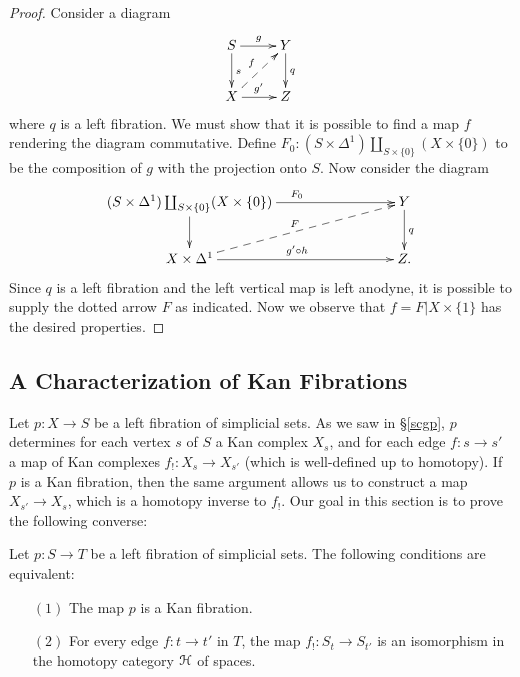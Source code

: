 \begin{proof}
Consider a diagram
$$ \xymatrix{ S \ar[d]^{s} \ar[r]^{g} & Y \ar[d]^{q} \\
X \ar[r]^{g'} \ar@{-->}^{f}[ur] & Z }$$
where $q$ is a left fibration. We must show that it is possible to find a map
$f$ rendering the diagram commutative. Define
$F_0: (S \times \Delta^1) \coprod_{ S \times \{ 0 \} } (X \times \{0\})$
to be the composition of $g$ with the projection onto $S$.
Now consider the diagram
$$ \xymatrix{ (S \times \Delta^1) \coprod_{ S \times \{0\} }
(X \times \{0\}) \ar[d] \ar[rrr]^{F_0} & & & Y \ar[d]^{q} \\
X \times \Delta^1 \ar[rrr]^{g' \circ h} \ar@{-->}[urrr]^{F} & & & Z. }$$
Since $q$ is a left fibration and the left vertical map is left anodyne, it
is possible to supply the dotted arrow $F$ as indicated. Now we observe that
$f = F|X \times \{1\}$ has the desired properties.
\end{proof}

\subsection{A Characterization of Kan Fibrations}\label{crit}

Let $p: X \rightarrow S$ be a left fibration of simplicial sets. As we saw in \S \ref{scgp}, $p$ determines for each vertex $s$ of $S$ a Kan complex $X_{s}$, and for each edge $f: s \rightarrow s'$ a map of Kan complexes $f_{!}: X_{s} \rightarrow X_{s'}$ (which is well-defined up to homotopy). If $p$ is a Kan fibration, then the same argument allows us to construct a map $X_{s'} \rightarrow X_{s}$, which is a homotopy inverse to $f_{!}$. Our goal in this section is to prove the following converse:

\begin{proposition}\label{dent}
Let $p: S \rightarrow T$ be a left fibration of simplicial sets. The following conditions are equivalent:

\begin{itemize}
\item[$(1)$] The map $p$ is a Kan fibration.
\item[$(2)$] For every edge $f: t \rightarrow t'$ in $T$, the map $f_{!}: S_{t} \rightarrow S_{t'}$ is an isomorphism
in the homotopy category $\operatorname{\mathcal{H}}$ of spaces.
\end{itemize}

\end{proposition}

